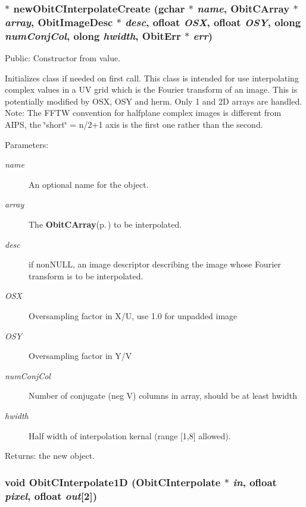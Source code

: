 \subsubsection{$\ast$ new\-Obit\-CInterpolate\-Create (gchar $\ast$ {\em name}, {\bf Obit\-CArray} $\ast$ {\em array}, {\bf Obit\-Image\-Desc} $\ast$ {\em desc}, {\bf ofloat} {\em OSX}, {\bf ofloat} {\em OSY}, {\bf olong} {\em num\-Conj\-Col}, {\bf olong} {\em hwidth}, {\bf Obit\-Err} $\ast$ {\em err})}\label{ObitCInterpolate_8c_a10}


Public: Constructor from value. 

Initializes class if needed on first call. This class is intended for use interpolating complex values in a UV grid which is the Fourier transform of an image. This is potentially modified by OSX, OSY and herm. Only 1 and 2D arrays are handled. Note: The FFTW convention for halfplane complex images is different from AIPS, the \char`\"{}short\char`\"{} = n/2+1 axis is the first one rather than the second. \begin{Desc}
\item[Parameters:]
\begin{description}
\item[{\em name}]An optional name for the object. \item[{\em array}]The {\bf Obit\-CArray}{\rm (p.\,\pageref{structObitCArray})} to be interpolated. \item[{\em desc}]if non\-NULL, an image descriptor describing the image whose Fourier transform is to be interpolated. \item[{\em OSX}]Oversampling factor in X/U, use 1.0 for unpadded image \item[{\em OSY}]Oversampling factor in Y/V \item[{\em num\-Conj\-Col}]Number of conjugate (neg V) columns in array, should be at least hwidth \item[{\em hwidth}]Half width of interpolation kernal (range [1,8] allowed). \end{description}
\end{Desc}
\begin{Desc}
\item[Returns:]the new object. \end{Desc}
\subsubsection{\setlength{\rightskip}{0pt plus 5cm}void Obit\-CInterpolate1D ({\bf Obit\-CInterpolate} $\ast$ {\em in}, {\bf ofloat} {\em pixel}, {\bf ofloat} {\em out}[2])}\label{ObitCInterpolate_8c_a16}


